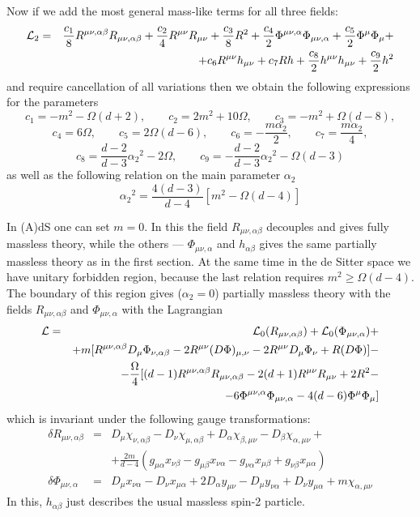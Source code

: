 \documentclass[a4paper,12pt]{article}
\begin{document}
Now if we add the most general mass-like terms for all three fields:
\begin{eqnarray}
{\cal L}_2 &=& \frac{c_1}{8} R^{\mu\nu,\alpha\beta} R_{\mu\nu,\alpha\beta}
+ \frac{c_2}{4} R^{\mu\nu} R_{\mu\nu} + \frac{c_3}{8} R^2 +
\frac{c_4}{2} \Phi^{\mu\nu,\alpha} \Phi_{\mu\nu,\alpha}
+ \frac{c_5}{2} \Phi^\mu \Phi_\mu + \nonumber \\
 && + c_6 R^{\mu\nu} h_{\mu\nu} + c_7 R h + \frac{c_8}{2}
 h^{\mu\nu} h_{\mu\nu} + \frac{c_9}{2} h^2
\end{eqnarray}
and require cancellation of all variations then we obtain the following
expressions for the parameters
$$
c_1 = - m^2 - \Omega (d+2), \qquad c_2 = 2 m^2 + 10 \Omega, \qquad
c_3 = - m^2 + \Omega (d-8),
$$
$$
c_4 = 6 \Omega, \qquad c_5 = 2 \Omega (d-6), \qquad c_6 = -
\frac{m \alpha_2}{2}, \qquad c_7 = \frac{m\alpha_2}{4},
$$
$$
c_8 = \frac{d-2}{d-3} \alpha_2{}^2 - 2 \Omega, \qquad
c_9 = - \frac{d-2}{d-3} \alpha_2{}^2 - \Omega (d-3)
$$
as well as the following relation on the main parameter $\alpha_2$
\begin{equation}
\alpha_2{}^2 = \frac{4(d-3)}{d-4} [ m^2 - \Omega (d-4)]
\end{equation}

In (A)dS one can set $m = 0$. In this the field $R_{\mu\nu,\alpha\beta}$
decouples and gives fully massless theory, while the others ---
$\Phi_{\mu\nu,\alpha}$ and $h_{\alpha\beta}$ gives the same partially
massless theory as in the first section. At the same time in the de Sitter
space we have unitary forbidden region, because the last relation
requires $m^2 \ge \Omega (d-4)$. The boundary of this region gives
($\alpha_2 = 0$) partially massless theory with the fields
$R_{\mu\nu,\alpha\beta}$ and $\Phi_{\mu\nu,\alpha}$ with the Lagrangian
\begin{eqnarray}
{\cal L} &=& {\cal L}_0 (R_{\mu\nu,\alpha\beta}) + {\cal L}_0
(\Phi_{\mu\nu,\alpha}) + \nonumber \\
 && + m [ R^{\mu\nu,\alpha\beta} D_\mu \Phi_{\nu,\alpha\beta}
 - 2 R^{\mu\nu} (D \Phi)_{\mu,\nu} - 2 R^{\mu\nu} D_\mu \Phi_\nu
 + R (D \Phi) ] - \nonumber \\
 && - \frac{\Omega}{4} [ (d-1) R^{\mu\nu,\alpha\beta}
 R_{\mu\nu,\alpha\beta} - 2 (d+1) R^{\mu\nu} R_{\mu\nu}
 + 2 R^2 - \nonumber \\
 && - 6 \Phi^{\mu\nu,\alpha} \Phi_{\mu\nu,\alpha} - 4 (d-6) \Phi^\mu
 \Phi_\mu ]
\end{eqnarray}
which is invariant under the following gauge transformations:
\begin{eqnarray}
\delta R_{\mu\nu,\alpha\beta} &=& D_\mu \chi_{\nu,\alpha\beta}
- D_\nu \chi_{\mu,\alpha\beta} + D_\alpha \chi_{\beta,\mu\nu}
- D_\beta \chi_{\alpha,\mu\nu} + \nonumber \\
 && + \frac{2m}{d-4} ( g_{\mu\alpha} x_{\nu\beta} - g_{\mu\beta}
 x_{\nu\alpha} - g_{\nu\alpha} x_{\mu\beta} + g_{\nu\beta}
 x_{\mu\alpha} ) \\
\delta \Phi_{\mu\nu,\alpha} &=& D_\mu x_{\nu\alpha} - D_\nu x_{\mu\alpha}
+ 2 D_\alpha y_{\mu\nu} - D_\mu y_{\nu\alpha} + D_\nu y_{\mu\alpha}
+ m \chi_{\alpha,\mu\nu} \nonumber
\end{eqnarray}
In this, $h_{\alpha\beta}$ just describes the usual massless spin-2
particle.
\end{document}
